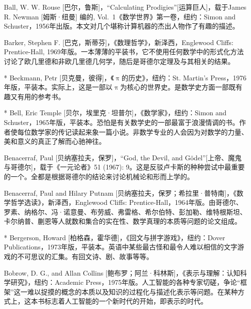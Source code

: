 \begin{thebib}
\begin{biblist}
\item Ball, W. W. Rouse [巴尔，鲁斯]，“Calculating Prodigies”[运算巨人]，载于James R. Newman [姆斯·纽曼] 编的, Vol.~1《数学世界》第一卷，纽约：Simon and Schuster，1956年出版。本文对几个堪称计算机器的杰出人物作了有趣的描述。

\item Barker, Stephen F. [巴克，斯蒂芬]，《数理哲学》，新泽西，Englewood Cliffs: Prentice-Hall, 1969年版。一本薄薄的平装书，它不使用任何数学中的形式化方法讨论了欧几里德和非欧几里德几何学，随后是哥德尔定理及与其相关的结果。

\item[*] Beckmann, Petr [贝克曼，彼得]，《$\uppi$的历史》，纽约：St. Martin's Press，1976年版，平装本。实际上，这是一部以$\uppi$为核心的世界史。是数学史方面一部既有趣又有用的参考书。

\item[*] Bell, Eric Temple [贝尔，埃里克·坦普尔]，《数学家》，纽约：Simon and Schuster，1965年版，平装本。恐怕是有关数学史的一部最富于浪漫情调的书。作者使每位数学家的传记读起来象一篇小说。非数学专业的人会因为对数学的力量、美和意义的真正了解而心驰神往。

\item Benacerraf, Paul [贝纳塞拉夫，保罗]，“God, the Devil, and Gödel”[上帝、魔鬼与哥德尔]，载于《一元论者》51 (1967): 9。这是反驳卢卡斯的种种尝试中最重要的一个。全都是根据哥德尔的结论来讨论机械论和形而上学的。

\item Benacerraf, Paul and Hilary Putnam [贝纳塞拉夫，保罗；希拉里·普特南]，《数学哲学选读》，新泽西，Englewood Cliffs: Prentice-Hall，1964年版。由哥德尔、罗素、纳格尔、冯·诺意曼、布劳威、弗雷格、希尔伯特、彭加勒、维特根斯坦、卡尔纳普、蒯恩等人就数和集合的实在性、数学真理的本质等问题的论文组成。

\item[*] Bergerson, Howard [柏格森，霍华德]，《回文与拼字游戏》，纽约：Dover Publications，1973年版，平装本。英语中某些最古怪和最令人难以相信的文字游戏的不可思议的汇集。有回文诗、剧、故事等等。

\item Bobrow, D. G., and Allan Collins [鲍布罗；阿兰·科林斯]，《表示与理解：认知科学研究》，纽约：Academic Press，1975年版。人工智能的各种专家切磋，争论“框架”这一难以捉摸的概念的本质以及知识的过程化与描述化表示等问题。在某种方式上，这本书标志着人工智能的一个新时代的开始，即表示的时代。


\end{biblist}
\end{thebib}
